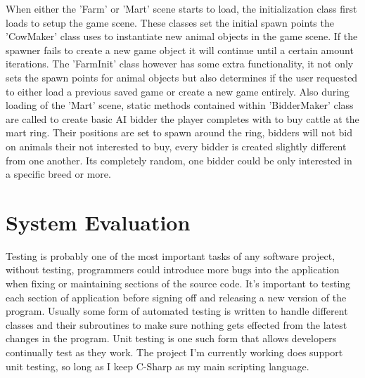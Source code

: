 When either the 'Farm' or 'Mart' scene starts to load, the initialization class first loads to setup the game scene. These classes set the initial spawn points the 'CowMaker' class uses to instantiate new animal objects in the game scene. If the spawner fails to create a new game object it will continue until a certain amount iterations. The 'FarmInit' class however has some extra functionality, it not only sets the spawn points for animal objects but also determines if the user requested to either load a previous saved game or create a new game entirely. 
Also during loading of the 'Mart' scene, static methods contained within 'BidderMaker' class are called to create basic AI bidder the player completes with to buy cattle at the mart ring. Their positions are set to spawn around the ring, bidders will not bid on animals their not interested to buy, every bidder is created slightly different from one another. Its completely random, one bidder could be only interested in a specific breed or more.

\chapter{System Evaluation}
Testing is probably one of the most important tasks of any software project, without testing, programmers could introduce more bugs into the application when fixing or maintaining sections of the source code. It's important to testing each section of application before signing off and releasing a new version of the program. Usually some form of automated testing is written to handle different classes and their subroutines to make sure nothing gets effected from the latest changes in the program. Unit testing is one such form that allows developers continually test as they work. The project I'm currently working does support unit testing, so long as I keep C-Sharp as my main scripting language.
